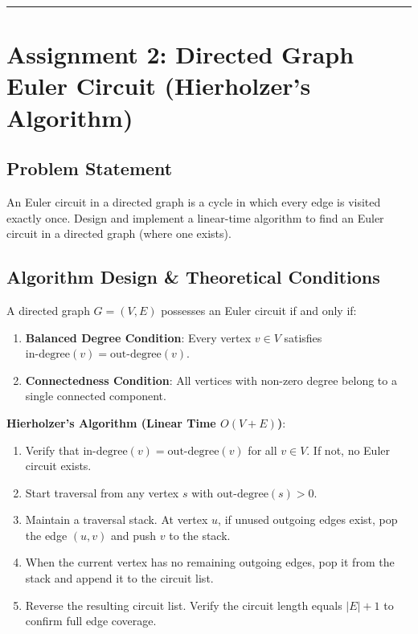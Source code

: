 \documentclass[12pt]{article}
\begin{document}
\vspace{0.5cm}
\hrule
\vspace{0.5cm}

\section*{Assignment 2: Directed Graph Euler Circuit (Hierholzer's Algorithm)}

\subsection*{Problem Statement}
An Euler circuit in a directed graph is a cycle in which every edge is visited exactly once. Design and implement a linear-time algorithm to find an Euler circuit in a directed graph (where one exists).

\subsection*{Algorithm Design \& Theoretical Conditions}
A directed graph $G = (V, E)$ possesses an Euler circuit if and only if:
\begin{enumerate}
    \item \textbf{Balanced Degree Condition}: Every vertex $v \in V$ satisfies $\text{in-degree}(v) = \text{out-degree}(v)$.
    \item \textbf{Connectedness Condition}: All vertices with non-zero degree belong to a single connected component.
\end{enumerate}

\textbf{Hierholzer's Algorithm (Linear Time $O(V + E)$)}:
\begin{enumerate}
    \item Verify that $\text{in-degree}(v) = \text{out-degree}(v)$ for all $v \in V$. If not, no Euler circuit exists.
    \item Start traversal from any vertex $s$ with $\text{out-degree}(s) > 0$.
    \item Maintain a traversal stack. At vertex $u$, if unused outgoing edges exist, pop the edge $(u, v)$ and push $v$ to the stack.
    \item When the current vertex has no remaining outgoing edges, pop it from the stack and append it to the circuit list.
    \item Reverse the resulting circuit list. Verify the circuit length equals $|E| + 1$ to confirm full edge coverage.
\end{enumerate}
\end{document}
